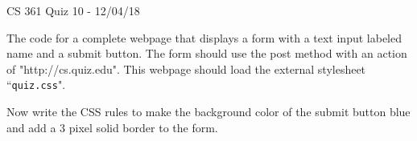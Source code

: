 \documentclass{exam}
\begin{document}
\begin{center}
	CS 361 Quiz 10 - 12/04/18
\end{center}

\vspace{1em}

\begin{center}
\end{center}

\begin{questions}
	
\question[6] The code for a complete webpage that displays a form with a text input labeled name and a submit button. The form should use the post method with an action of "http://cs.quiz.edu". This webpage should load the external stylesheet ``\texttt{quiz.css}".
 
\vfill

\question[4] Now write the CSS rules to make the background color of the submit button blue and add a 3 pixel solid border to the form.

\vfill

\end{questions}
\end{document}
